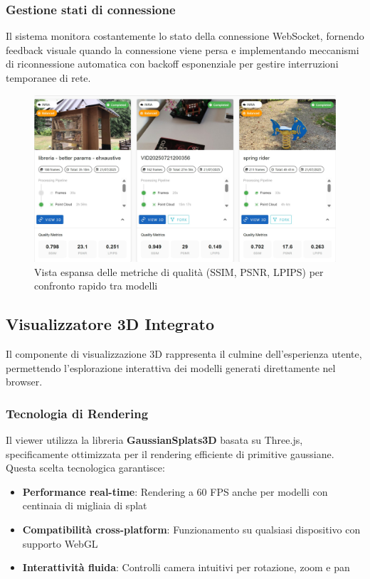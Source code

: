 \subsubsection{Gestione stati di connessione}
Il sistema monitora costantemente lo stato della connessione WebSocket, fornendo feedback visuale quando la connessione viene persa e implementando meccanismi di riconnessione automatica con backoff esponenziale per gestire interruzioni temporanee di rete.

\begin{figure}[htbp]
	\centering
	\includegraphics[width=\textwidth]{images/frontend_show_metrics.jpg}
	\caption{Vista espansa delle metriche di qualità (SSIM, PSNR, LPIPS) per confronto rapido tra modelli}
	\label{fig:dashboard_metrics}
\end{figure}

\subsection{Visualizzatore 3D Integrato}

Il componente di visualizzazione 3D rappresenta il culmine dell'esperienza utente, permettendo l'esplorazione interattiva dei modelli generati direttamente nel browser.

\subsubsection{Tecnologia di Rendering}

Il viewer utilizza la libreria \textbf{GaussianSplats3D} basata su Three.js, specificamente ottimizzata per il rendering efficiente di primitive gaussiane. Questa scelta tecnologica garantisce:

\begin{itemize}
	\item \textbf{Performance real-time}: Rendering a 60 FPS anche per modelli con centinaia di migliaia di splat
	\item \textbf{Compatibilità cross-platform}: Funzionamento su qualsiasi dispositivo con supporto WebGL
	\item \textbf{Interattività fluida}: Controlli camera intuitivi per rotazione, zoom e pan
\end{itemize}

